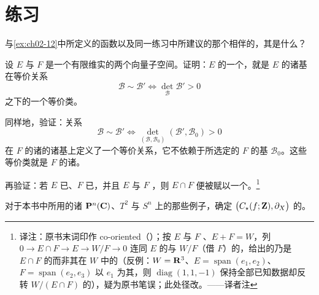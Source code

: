 
\section*{练习}
\label{sec:ch03-exercises}


\begin{exercise}\label{ex:ch03-13}
与\cref{ex:ch02-12}中所定义的函数以及同一练习中所建议的那个\trVectorField{}相伴的\trComplex，其\trHomology{}是什么？
\end{exercise}

\begin{exercise}\label{ex:ch03-14}
设 $E$ 与 $F$ 是一个有限维实\trVectorSpace{}的两个向量子空间。证明：$E$ 的一个\trOrientation，就是 $E$ 的诸基在等价关系
\[
\mathcal{B}\sim\mathcal{B}'\Longleftrightarrow \det_{\mathcal{B}}\mathcal{B}'>0
\]
之下的一个等价类。

同样地，验证：关系
\[
\mathcal{B}\sim\mathcal{B}'\Longleftrightarrow \det_{(\mathcal{B},\mathcal{B}_0)}(\mathcal{B}',\mathcal{B}_0)>0
\]
在 $F$ 的诸\trComplement{}的诸基上定义了一个等价关系，它不依赖于所选定的 $F$ 的基 $\mathcal{B}_0$。这些等价类就是 $F$ 的诸\trCoorientation。

再验证：若 $E$ 已\trOrientation、$F$ 已\trCoorientation，并且 $E$ 与 $F$ \trTransverse，则 $E\cap F$ 便被赋以一个\trOrientation。\footnote{译注：原书末词印作 co-oriented（\trCoorientation）；按 $E$ 与 $F$ \trTransverse、$E+F=W$，\trExact{}列 $0\to E\cap F\to E\to W/F\to 0$ 连同 $E$ 的\trOrientation{}与 $W/F$（借 $F$）的\trOrientation，给出的乃是 $E\cap F$ 的\trOrientation{}而非其在 $W$ 中的\trCoorientation（反例：$W=\mathbf{R}^3$、$E=\operatorname{span}(e_1,e_2)$、$F=\operatorname{span}(e_2,e_3)$ 以 $e_1$ 为其\trCoorientation，则 $\operatorname{diag}(1,1,-1)$ 保持全部已知数据却反转 $W/(E\cap F)$ 的\trOrientation），疑为原书笔误；此处径改。——译者注}
\end{exercise}

\begin{exercise}\label{ex:ch03-15}
对于本书中所用的诸\trManifold{} $\mathbf{P}^n(\mathbf{C})$、$T^2$ 与 $S^n$ 上的那些\trMorseFunction{}例子，确定\trComplex{} $\bigl(C_{\star}(f;\mathbf{Z}),\partial_X\bigr)$ 的\trHomology。
\end{exercise}
